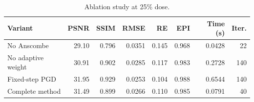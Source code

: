 \begin{table}[tbp]
\centering
\caption{Ablation study at 25\% dose.}
\label{tab:ablation}
\setlength{\tabcolsep}{3pt}
\begin{tabular}{@{}lrrrrrrr@{}}\toprule
Variant & PSNR & SSIM & RMSE & RE & EPI & Time (s) & Iter.\\ \midrule
No Anscombe & 29.10 & 0.796 & 0.0351 & 0.145 & 0.968 & 0.0428 & 22 \\
No adaptive weight & 30.91 & 0.902 & 0.0285 & 0.117 & 0.983 & 0.2728 & 140 \\
Fixed-step PGD & 31.95 & 0.929 & 0.0253 & 0.104 & 0.988 & 0.6544 & 140 \\
Complete method & 31.49 & 0.899 & 0.0266 & 0.110 & 0.985 & 0.0791 & 40 \\
\bottomrule\end{tabular}
\end{table}